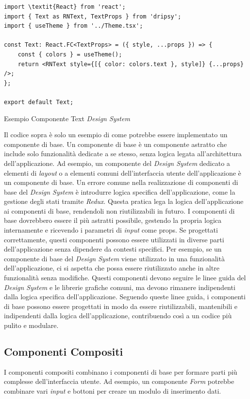 \begin{listing}[H]
    \begin{verbatim}
import \textit{React} from 'react';
import { Text as RNText, TextProps } from 'dripsy';
import { useTheme } from '../Theme.tsx';

const Text: React.FC<TextProps> = ({ style, ...props }) => {
    const { colors } = useTheme();
    return <RNText style={[{ color: colors.text }, style]} {...props} />;
};

export default Text;
    \end{verbatim}
    \caption{Esempio Componente Text \textit{Design System}}
    \label{listing_text_design_system}
\end{listing}
Il codice sopra è solo un esempio di come potrebbe essere implementato un componente di base.
Un componente di base è un componente astratto che include solo funzionalità dedicate a se stesso,
senza logica legata all'architettura dell'applicazione.
Ad esempio, un componente del \textit{Design System} dedicato a elementi di \textit{layout} o a elementi comuni dell'interfaccia utente dell'applicazione è un componente di base.
Un errore comune nella realizzazione di componenti di base del \textit{Design System} è introdurre logica specifica dell'applicazione, 
come la gestione degli stati tramite \textit{Redux}.
Questa pratica lega la logica dell'applicazione ai componenti di base, rendendoli non riutilizzabili in futuro.
I componenti di base dovrebbero essere il più astratti possibile, gestendo la propria logica internamente e ricevendo i parametri di \textit{input} come props.
Se progettati correttamente, questi componenti possono essere utilizzati in diverse parti dell'applicazione senza dipendere da contesti specifici.
Per esempio, se un componente di base del \textit{Design System} viene utilizzato in una funzionalità dell'applicazione, ci si aspetta che possa essere riutilizzato anche in altre funzionalità senza modifiche.
Questi componenti devono seguire le linee guida del \textit{Design System} e le librerie grafiche comuni, ma devono rimanere indipendenti dalla logica specifica dell'applicazione.
Seguendo queste linee guida, i componenti di base possono essere progettati in modo da essere riutilizzabili, mantenibili e indipendenti dalla logica dell'applicazione, contribuendo così a un codice più pulito e modulare.

\subsection{Componenti Compositi}
I componenti compositi combinano i componenti di base per formare parti più complesse dell'interfaccia utente.
Ad esempio, un componente \textit{Form} potrebbe combinare vari \textit{input} e bottoni per creare un modulo di inserimento dati.

